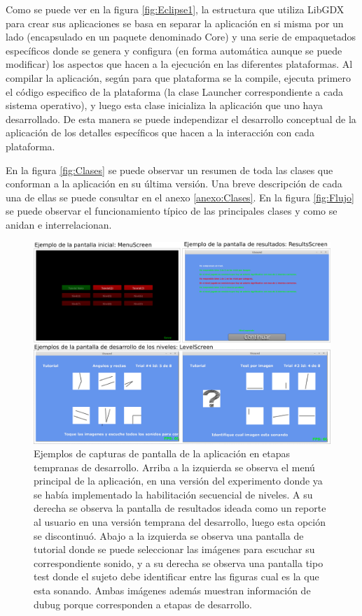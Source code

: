 \documentclass{article}
\begin{document}
    Como se puede ver en la figura \ref{fig:Eclipse1}, la estructura que utiliza LibGDX para crear sus aplicaciones se basa en separar la aplicación en si misma por un lado (encapsulado en un paquete denominado Core) y una serie de empaquetados específicos donde se genera y configura (en forma automática aunque se puede modificar) los aspectos que hacen a la ejecución en las diferentes plataformas. Al compilar la aplicación, según para que plataforma se la compile, ejecuta primero el código especifico de la plataforma (la clase Launcher correspondiente a cada sistema operativo), y luego esta clase inicializa la aplicación que uno haya desarrollado. De esta manera se puede independizar el desarrollo conceptual de la aplicación de los detalles específicos que hacen a la interacción con cada plataforma. 
    
    En la figura \ref{fig:Clases} se puede observar un resumen de toda las clases que conforman a la aplicación en su última versión. Una breve descripción de cada una de ellas se puede consultar en el anexo \ref{anexo:Clases}. En la figura \ref{fig:Flujo} se puede observar el funcionamiento típico de las principales clases y como se anidan e interrelacionan. 
    
            
    \begin{figure}
        \center
        \includegraphics[width=\textwidth]{Imagenes/Pantallas1.png}
        \caption{Ejemplos de  capturas de pantalla de la aplicación en etapas tempranas de desarrollo. Arriba a la izquierda se observa el menú principal de la aplicación, en una versión del experimento donde ya se había implementado la habilitación secuencial de niveles. A su derecha se observa la pantalla de resultados ideada como un reporte al usuario en una versión temprana del desarrollo, luego esta opción se discontinuó. Abajo a la izquierda se observa una pantalla de tutorial donde se puede seleccionar las imágenes para escuchar su correspondiente sonido, y a su derecha se observa una pantalla tipo test donde el sujeto debe identificar entre las figuras cual es la que esta sonando. Ambas imágenes además muestran información de dubug porque corresponden a etapas de desarrollo. }
        \label{fig:Pantallas1}
    \end{figure}
    
\end{document}

